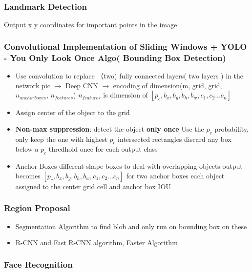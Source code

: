 \documentclass[11pt, openany]{book}              %
\begin{document}
\subsubsection{Landmark Detection}

Output x y coordinates for important points in the image

\subsubsection{Convolutional Implementation of Sliding Windows + YOLO - You Only Look Once Algo( Bounding Box Detection)}

\begin{itemize}
\item Use convolution to replace （two) fully connected layers( two layers ) in the network
	\subitem pic $\rightarrow$ Deep CNN  $\rightarrow$ encoding of dimension(m, grid, grid, $n_{anchor boxes}$, $n_{features}$)
	\subitem $n_{features}$ is dimension of $[p_c, b_x,b_y,b_h,b_w, c_1,c_2...c_n]$
\item Assign center of the object to the grid
\item \textbf{Non-max suppression}: detect the object \textbf{only once}
	\subitem Use the $p_c$ probability, only keep the one with highest $p_c$ intersected rectangles
	\subitem discard any box below a $p_c$ thredhold
	\subitem once for each output class
\item Anchor Boxes
	\subitem different shape boxes to deal with overlapping objects
	\subitem output becomes $[p_c, b_x,b_y,b_h,b_w, c_1,c_2...c_n]$ for two anchor boxes
	\subitem each object assigned to the center grid cell and anchor box IOU
\end{itemize}

\subsubsection{Region Proposal}
\begin{itemize}
	\item Segmentation Algorithm to find blob and only run on bounding box on these
	\item R-CNN and Fast R-CNN algorithm, Faster Algorithm
\end{itemize}

\subsubsection{Face Recognition}
\end{document}
